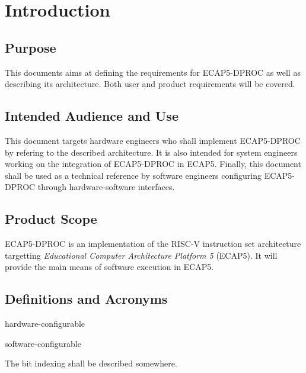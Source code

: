 \section{Introduction}
\subsection{Purpose}

\begin{content}
This documents aims at defining the requirements for ECAP5-DPROC as well as describing its architecture. Both user and product requirements will be covered.
\end{content}

\subsection{Intended Audience and Use}

\begin{content}
This document targets hardware engineers who shall implement ECAP5-DPROC by refering to the described architecture. It is also intended for system engineers working on the integration of ECAP5-DPROC in ECAP5. Finally, this document shall be used as a technical reference by software engineers configuring ECAP5-DPROC through hardware-software interfaces.
\end{content}

\subsection{Product Scope}

\begin{content}
  ECAP5-DPROC is an implementation of the RISC-V instruction set architecture targetting \textit{Educational Computer Architecture Platform 5} (ECAP5). It will provide the main means of software execution in ECAP5.
\end{content}

\subsection{Definitions and Acronyms}

\begin{content}
hardware-configurable

software-configurable
\end{content}

The bit indexing shall be described somewhere.

